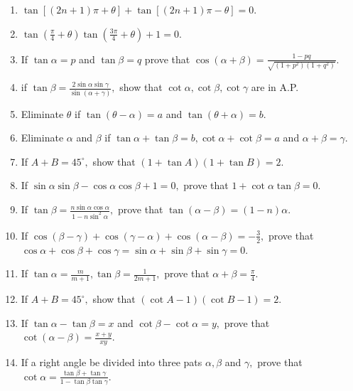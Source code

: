\begin{enumerate}[resume]
\item $\tan[(2n + 1)\pi + \theta] + \tan[(2n + 1)\pi - \theta] = 0$.

\item $\tan\left(\frac{\pi}{4} + \theta\right)\tan\left(\frac{3\pi}{4} + \theta\right) + 1 = 0$.

\item If $\tan\alpha = p$ and $\tan\beta = q$ prove that $\cos(\alpha + \beta) = \frac{1 - pq}{\sqrt{(1 + p^2)(1 +
    q^2)}}$.

\item if $\tan \beta = \frac{2\sin\alpha\sin\gamma}{\sin(\alpha + \gamma)},$ show that $\cot\alpha, \cot\beta,
    \cot\gamma$ are in A.P.

\item Eliminate $\theta$ if $\tan(\theta - \alpha) = a$ and $\tan(\theta + \alpha) = b$.

\item Eliminate $\alpha$ and $\beta$ if $\tan\alpha + \tan\beta = b, \cot\alpha + \cot\beta = a$ and
    $\alpha + \beta = \gamma$.

\item If $A + B = 45^\circ,$ show that $(1 + \tan A)(1 + \tan B) = 2$.

\item If $\sin\alpha\sin\beta - \cos\alpha\cos\beta + 1 = 0,$ prove that $1 + \cot\alpha\tan\beta = 0$.

\item If $\tan\beta = \frac{n\sin\alpha\cos\alpha}{1 - n\sin^2\alpha},$ prove that $\tan(\alpha - \beta) = (1 - n)\alpha$.

\item If $\cos(\beta - \gamma) + \cos(\gamma - \alpha) + \cos(\alpha - \beta) = -\frac{3}{2},$ prove that $\cos\alpha +
    \cos\beta + \cos\gamma = \sin\alpha + \sin\beta + \sin\gamma = 0$.

\item If $\tan\alpha = \frac{m}{m + 1}, \tan\beta = \frac{1}{2m + 1},$ prove that $\alpha + \beta = \frac{\pi}{4}$.

\item If $A + B = 45^\circ,$ show that $(\cot A - 1)(\cot B - 1) = 2$.

\item If $\tan\alpha - \tan\beta = x$ and $\cot\beta - \cot\alpha = y,$ prove that $\cot(\alpha - \beta) =
    \frac{x + y}{xy}$.

\item If a right angle be divided into three pats $\alpha, \beta$ and $\gamma,$ prove that $\cot\alpha =
    \frac{\tan\beta + \tan\gamma}{1 - \tan\beta\tan\gamma}$.


\end{enumerate}
